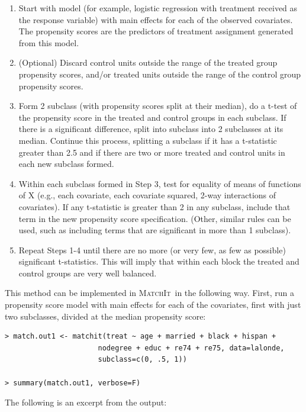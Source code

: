 \documentclass[oneside,letterpaper,titlepage]{article}
\newcommand{\MatchIt}{\textsc{MatchIt}}
\begin{document}
\begin{enumerate}
\item Start with model (for example, logistic regression with
  treatment received as the response variable) with main effects for
  each of the observed covariates.  The propensity scores are the
  predictors of treatment assignment generated from this model.
\item (Optional) Discard control units outside the range of the
  treated group propensity scores, and/or treated units outside the
  range of the control group propensity scores.
\item Form 2 subclass (with propensity scores split at their median),
  do a t-test of the propensity score in the treated and control
  groups in each subclass.  If there is a significant difference,
  split into subclass into 2 subclasses at its median.  Continue this
  process, splitting a subclass if it has a t-statistic greater than
  2.5 and if there are two or more treated and control units in each
  new subclass formed.
\item Within each subclass formed in Step 3, test for equality of
  means of functions of X (e.g., each covariate, each covariate
  squared, 2-way interactions of covariates).  If any t-statistic is
  greater than 2 in any subclass, include that term in the new
  propensity score specification.  (Other, similar rules can be used,
  such as including terms that are significant in more than 1
  subclass).
\item Repeat Steps 1-4 until there are no more (or very few, as few as
  possible) significant t-statistics.  This will imply that within
  each block the treated and control groups are very well balanced.
\end{enumerate}

This method can be implemented in \MatchIt\ in the following way.
First, run a propensity score model with main effects for each of the
covariates, first with just two subclasses, divided at the median
propensity score:

\begin{verbatim}
> match.out1 <- matchit(treat ~ age + married + black + hispan +
                      nodegree + educ + re74 + re75, data=lalonde,                      
                      subclass=c(0, .5, 1))

> summary(match.out1, verbose=F)
\end{verbatim}

The following is an excerpt from the output:
\end{document}
